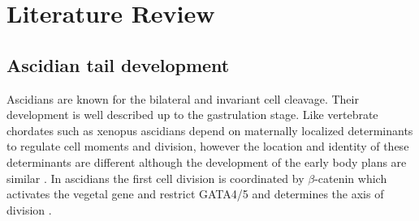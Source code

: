 \chapter{Literature Review}
\section{Ascidian tail development}

Ascidians are known for the bilateral and invariant cell cleavage. Their development is well described up to the gastrulation stage\cite{nishida_cell_1983,nishida_cell_1985,nishida_cell_1987}. Like vertebrate chordates such as xenopus ascidians depend on maternally localized determinants to regulate cell moments and division, however the location and identity of these determinants are different although the development of the early body plans are similar \cite{lemaire_ascidians_2008}. In ascidians the first cell division is coordinated by  $\beta$-catenin which activates the vegetal gene and restrict GATA4/5 \cite{lemaire_unfolding_2009} and determines the axis of division \cite{imai_early_2002}. 
